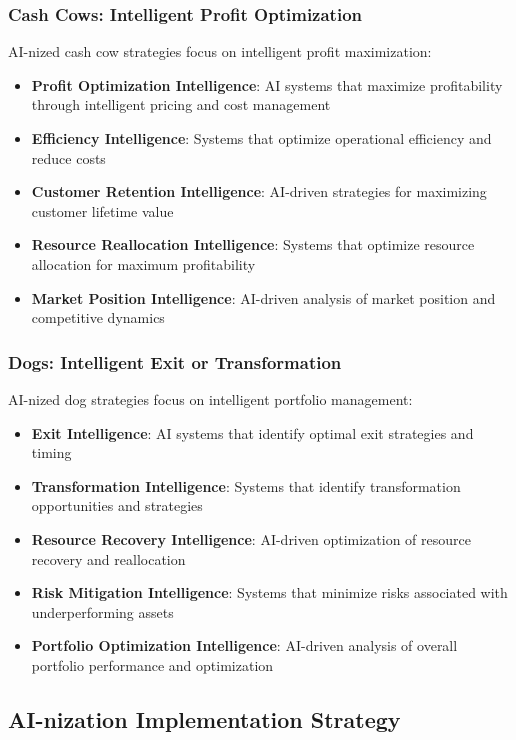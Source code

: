 \subsubsection{Cash Cows: Intelligent Profit Optimization}

AI-nized cash cow strategies focus on intelligent profit maximization:

\begin{itemize}
    \item \textbf{Profit Optimization Intelligence}: AI systems that maximize profitability through intelligent pricing and cost management
    \item \textbf{Efficiency Intelligence}: Systems that optimize operational efficiency and reduce costs
    \item \textbf{Customer Retention Intelligence}: AI-driven strategies for maximizing customer lifetime value
    \item \textbf{Resource Reallocation Intelligence}: Systems that optimize resource allocation for maximum profitability
    \item \textbf{Market Position Intelligence}: AI-driven analysis of market position and competitive dynamics
\end{itemize}

\subsubsection{Dogs: Intelligent Exit or Transformation}

AI-nized dog strategies focus on intelligent portfolio management:

\begin{itemize}
    \item \textbf{Exit Intelligence}: AI systems that identify optimal exit strategies and timing
    \item \textbf{Transformation Intelligence}: Systems that identify transformation opportunities and strategies
    \item \textbf{Resource Recovery Intelligence}: AI-driven optimization of resource recovery and reallocation
    \item \textbf{Risk Mitigation Intelligence}: Systems that minimize risks associated with underperforming assets
    \item \textbf{Portfolio Optimization Intelligence}: AI-driven analysis of overall portfolio performance and optimization
\end{itemize}

\subsection{AI-nization Implementation Strategy}

